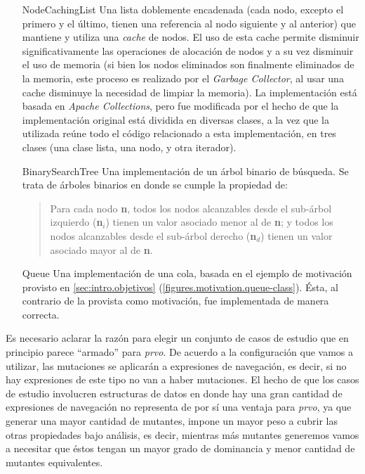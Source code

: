 \begin{enumerate}[leftmargin=.75cm,align=left,style=nextline]
	\item[NodeCachingList] Una lista doblemente encadenada (cada nodo, excepto el primero y el \'ultimo, tienen una referencia al nodo siguiente y al anterior) que mantiene y utiliza una \emph{cache} de nodos. El uso de esta cache permite disminuir significativamente las operaciones de alocaci\'on de nodos y a su vez disminuir el uso de memoria (si bien los nodos eliminados son finalmente eliminados de la memoria, este proceso es realizado por el \emph{Garbage Collector}, al usar una cache disminuye la necesidad de limpiar la memoria). La implementaci\'on est\'a basada en \emph{Apache Collections}, pero fue modificada por el hecho de que la implementaci\'on original est\'a dividida en diversas clases, a la vez que la utilizada re\'une todo el c\'odigo relacionado a esta implementaci\'on, en tres clases (una clase lista, una nodo, y otra iterador).
	
	\item[BinarySearchTree] Una implementaci\'on de un \'arbol binario de b\'usqueda. Se trata de \'arboles binarios en donde se cumple la propiedad de:
	\begin{quote}
		Para cada nodo \textbf{n}, todos los nodos alcanzables desde el sub-\'arbol izquierdo (\textbf{n$_i$}) tienen un valor asociado menor al de \textbf{n}; y todos los nodos alcanzables desde el sub-\'arbol derecho (\textbf{n$_d$}) tienen un valor asociado mayor al de \textbf{n}.
	\end{quote}
	
	\item[Queue] Una implementaci\'on de una cola, basada en el ejemplo de motivaci\'on provisto en \ref{sec:intro.objetivos} (\ref{figures.motivation.queue-class}). \'Esta, al contrario de la provista como motivaci\'on, fue implementada de manera correcta.
	
\end{enumerate}

Es necesario aclarar la raz\'on para elegir un conjunto de casos de estudio que en principio parece ``armado'' para \emph{prvo}. De acuerdo a la configuraci\'on que vamos a utilizar, las mutaciones se aplicar\'an a expresiones de navegaci\'on, es decir, si no hay expresiones de este tipo no van a haber mutaciones. El hecho de que los casos de estudio involucren estructuras de datos en donde hay una gran cantidad de expresiones de navegaci\'on no representa de por s\'i una ventaja para \emph{prvo}, ya que generar una mayor cantidad de mutantes, impone un mayor peso a cubrir las otras propiedades bajo an\'alisis, es decir, mientras m\'as mutantes generemos vamos a necesitar que \'estos tengan un mayor grado de dominancia y menor cantidad de mutantes equivalentes.


